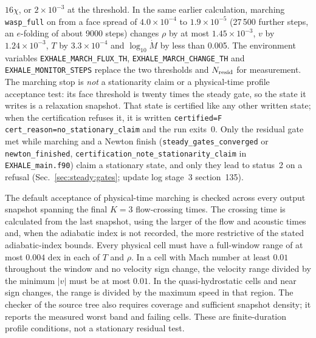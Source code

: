 $16\chi$, or $2\times10^{-3}$ at the threshold.
In the same earlier calculation, marching \texttt{wasp\_full} on from a face spread of
$4.0\times10^{-4}$ to $1.9\times10^{-5}$ (27\,500 further steps, an
$e$-folding of about 9000 steps) changes $\rho$ by at most
$1.45\times10^{-3}$, $v$ by $1.24\times10^{-3}$, $T$ by $3.3\times10^{-4}$ and
$\log_{10}\dot M$ by less than 0.005.  The environment variables
\texttt{EXHALE\_MARCH\_FLUX\_TH}, \texttt{EXHALE\_MARCH\_CHANGE\_TH} and
\texttt{EXHALE\_MONITOR\_STEPS} replace the two thresholds and
$N_{\rm resid}$ for measurement.  The marching stop is \emph{not} a
stationarity claim or a physical-time profile acceptance test: its face threshold is twenty times the steady gate, so the
state it writes is a relaxation snapshot.  That state is certified like any
other written state; when the certification refuses it, it is written
\texttt{certified=F cert\_reason=no\_stationary\_claim} and the run exits~0.
Only the residual gate met while marching and a Newton finish
(\texttt{steady\_gates\_converged} or \texttt{newton\_finished},
\texttt{certification\_note\_stationarity\_claim} in \texttt{EXHALE\_main.f90})
claim a stationary state, and only they lead to status~2 on a refusal
(Sec.~\ref{sec:steady:gates}; update log stage~3 section~135).

The default acceptance of physical-time marching is
checked across every output snapshot spanning the final $K=3$ flow-crossing
times. The crossing time is calculated from the last snapshot, using the
larger of the flow and acoustic times and, when the adiabatic index is not
recorded, the more restrictive of the stated adiabatic-index bounds. Every
physical cell must have a full-window range of at most $0.004$ dex in each
of $T$ and $\rho$. In a cell with Mach number at least $0.01$ throughout
the window and no velocity sign change, the velocity range divided by the
minimum $|v|$ must be at most $0.01$. In the quasi-hydrostatic cells and
near sign changes, the range is divided by the maximum speed in that
region. The checker  of the source tree
also requires coverage and sufficient snapshot density;
it reports the measured worst band and failing cells. These are
finite-duration profile conditions, not a stationary residual test.

